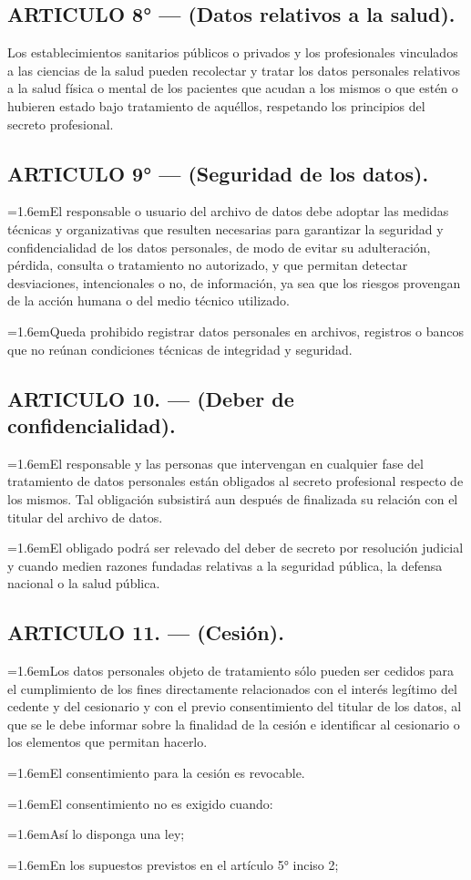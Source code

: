 \documentclass[10pt,a4paper]{article}
\newcommand{\articulo}[1]{\subsection{#1}}
\newcommand{\inciso}[2]{\par{\hangindent=1.6em\hangafter=1\makebox[1.6em][l]{#1}#2\par}}
\begin{document}
\articulo{ARTICULO 8° — (Datos relativos a la salud).}
Los establecimientos sanitarios públicos o privados y los profesionales vinculados a las ciencias de la salud pueden recolectar y tratar los datos personales relativos a la salud física o mental de los pacientes que acudan a los mismos o que estén o hubieren estado bajo tratamiento de aquéllos, respetando los principios del secreto profesional.

\articulo{ARTICULO 9° — (Seguridad de los datos).}
\inciso{1.}{El responsable o usuario del archivo de datos debe adoptar las medidas técnicas y organizativas que resulten necesarias para garantizar la seguridad y confidencialidad de los datos personales, de modo de evitar su adulteración, pérdida, consulta o tratamiento no autorizado, y que permitan detectar desviaciones, intencionales o no, de información, ya sea que los riesgos provengan de la acción humana o del medio técnico utilizado.}

\inciso{2.}{Queda prohibido registrar datos personales en archivos, registros o bancos que no reúnan condiciones técnicas de integridad y seguridad.}

\articulo{ARTICULO 10. — (Deber de confidencialidad).}
\inciso{1.}{El responsable y las personas que intervengan en cualquier fase del tratamiento de datos personales están obligados al secreto profesional respecto de los mismos. Tal obligación subsistirá aun después de finalizada su relación con el titular del archivo de datos.}

\inciso{2.}{El obligado podrá ser relevado del deber de secreto por resolución judicial y cuando medien razones fundadas relativas a la seguridad pública, la defensa nacional o la salud pública.}

\articulo{ARTICULO 11. — (Cesión).}
\inciso{1.}{Los datos personales objeto de tratamiento sólo pueden ser cedidos para el cumplimiento de los fines directamente relacionados con el interés legítimo del cedente y del cesionario y con el previo consentimiento del titular de los datos, al que se le debe informar sobre la finalidad de la cesión e identificar al cesionario o los elementos que permitan hacerlo.}

\inciso{2.}{El consentimiento para la cesión es revocable.}

\inciso{3.}{El consentimiento no es exigido cuando:}

\inciso{a)}{Así lo disponga una ley;}

\inciso{b)}{En los supuestos previstos en el artículo 5° inciso 2;}
\end{document}
